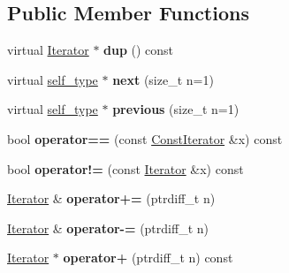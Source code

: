 \subsection*{Public Member Functions}
\begin{DoxyCompactItemize}
\item 
virtual \hyperlink{structswig_1_1Iterator}{Iterator} $\ast$ {\bfseries dup} () const \hypertarget{structswig_1_1Iterator_a3ac53c8ab0e68144707a0d6a58d5185d}{}\label{structswig_1_1Iterator_a3ac53c8ab0e68144707a0d6a58d5185d}

\item 
virtual \hyperlink{structswig_1_1ConstIterator}{self\+\_\+type} $\ast$ {\bfseries next} (size\+\_\+t n=1)\hypertarget{structswig_1_1Iterator_afcb230946b17c13d36f72eadb09269ae}{}\label{structswig_1_1Iterator_afcb230946b17c13d36f72eadb09269ae}

\item 
virtual \hyperlink{structswig_1_1ConstIterator}{self\+\_\+type} $\ast$ {\bfseries previous} (size\+\_\+t n=1)\hypertarget{structswig_1_1Iterator_a9bc6ba9658cbe86e59c229ff87945bc8}{}\label{structswig_1_1Iterator_a9bc6ba9658cbe86e59c229ff87945bc8}

\item 
bool {\bfseries operator==} (const \hyperlink{structswig_1_1ConstIterator}{Const\+Iterator} \&x) const \hypertarget{structswig_1_1Iterator_ac1fc518d4641e48ab68cf087cc90f62f}{}\label{structswig_1_1Iterator_ac1fc518d4641e48ab68cf087cc90f62f}

\item 
bool {\bfseries operator!=} (const \hyperlink{structswig_1_1Iterator}{Iterator} \&x) const \hypertarget{structswig_1_1Iterator_ae156e649eee229e4d40c9f730fccd0b1}{}\label{structswig_1_1Iterator_ae156e649eee229e4d40c9f730fccd0b1}

\item 
\hyperlink{structswig_1_1Iterator}{Iterator} \& {\bfseries operator+=} (ptrdiff\+\_\+t n)\hypertarget{structswig_1_1Iterator_a3b1062176dab18911f365577ff2e31d7}{}\label{structswig_1_1Iterator_a3b1062176dab18911f365577ff2e31d7}

\item 
\hyperlink{structswig_1_1Iterator}{Iterator} \& {\bfseries operator-\/=} (ptrdiff\+\_\+t n)\hypertarget{structswig_1_1Iterator_aee20358c59290f2c87134646765fa177}{}\label{structswig_1_1Iterator_aee20358c59290f2c87134646765fa177}

\item 
\hyperlink{structswig_1_1Iterator}{Iterator} $\ast$ {\bfseries operator+} (ptrdiff\+\_\+t n) const \hypertarget{structswig_1_1Iterator_a80de59ad8a3cd0feeb0293fe8e915ab5}{}\label{structswig_1_1Iterator_a80de59ad8a3cd0feeb0293fe8e915ab5}


\end{DoxyCompactItemize}
